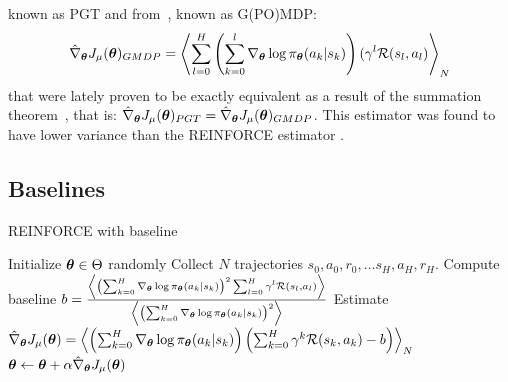known as PGT and from~\cite{DBLP:journals/corr/abs-1106-0665}, known as G(PO)MDP:
\[
\hat{\nabla}_{{\boldsymbol{\theta}}}J_\mu({\boldsymbol{\theta}})_{GMDP} = \left\langle \sum_{l=0}^H \left( \sum_{k=0}^{l} \nabla_{{\boldsymbol{\theta}}}\log\pi_{{\boldsymbol{\theta}}}(a_k|s_k) \right) (\gamma^{l}\mathcal{R}(s_l,a_l) \right\rangle_{N}
\]
that were lately proven to be exactly equivalent as a result of the summation theorem~\cite{rade2000springers}, that is: $\hat{\nabla}_{{\boldsymbol{\theta}}}J_\mu({\boldsymbol{\theta}})_{PGT} = \hat{\nabla}_{{\boldsymbol{\theta}}}J_\mu({\boldsymbol{\theta}})_{GMDP}$.
This estimator was found to have lower variance than the REINFORCE estimator \cite{DBLP:journals/corr/abs-1106-0665}.

\subsection{Baselines}
\begin{algorithm}[t]
\caption{REINFORCE with baseline}
\label{alg:reinforce-baseline}
\begin{algorithmic}
\State Initialize ${\boldsymbol{\theta}} \in \Theta$ randomly
\State Collect $N$ trajectories $s_0,a_0,r_0,\ldots s_H,a_H,r_H$.
\State Compute baseline $b = \frac{\left\langle \left(\sum_{k=0}^H \nabla_{{\boldsymbol{\theta}}}\log\pi_{{\boldsymbol{\theta}}}(a_k|s_k) \right)^2\sum_{l=0}^{H}\gamma^l\mathcal{R}(s_l,a_l) \right\rangle}{\left\langle \left( \sum_{k=0}^H \nabla_{{\boldsymbol{\theta}}}\log\pi_{{\boldsymbol{\theta}}}(a_k|s_k) \right)^2 \right\rangle}$
\State Estimate $\hat{\nabla}_{{\boldsymbol{\theta}}}J_\mu({\boldsymbol{\theta}}) = \left\langle \left(\sum_{k=0}^{H} \nabla_{{\boldsymbol{\theta}}}\log\pi_{{\boldsymbol{\theta}}}(a_k|s_k)  \right)\left(\sum_{k=0}^H \gamma^k\mathcal{R}(s_k,a_k) - b\right) \right\rangle_{N}$
\State ${\boldsymbol{\theta}} \gets {\boldsymbol{\theta}} + \alpha\hat{\nabla}_{{\boldsymbol{\theta}}}J_{\mu}({\boldsymbol{\theta}})$
\EndFor
\end{algorithmic}
\end{algorithm}

